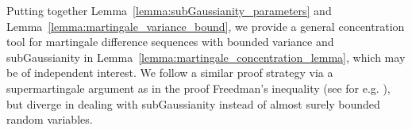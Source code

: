 



Putting together Lemma~\ref{lemma:subGaussianity_parameters} and Lemma~\ref{lemma:martingale_variance_bound}, we provide a general concentration tool for martingale difference sequences with bounded variance and subGaussianity in
Lemma~\ref{lemma:martingale_concentration_lemma}, which may be of independent interest. We follow a similar proof strategy via a supermartingale argument as in the proof Freedman's inequality (see for e.g. \cite{tropp2011freedman}), but diverge in dealing with subGaussianity instead of almost surely bounded random variables.

